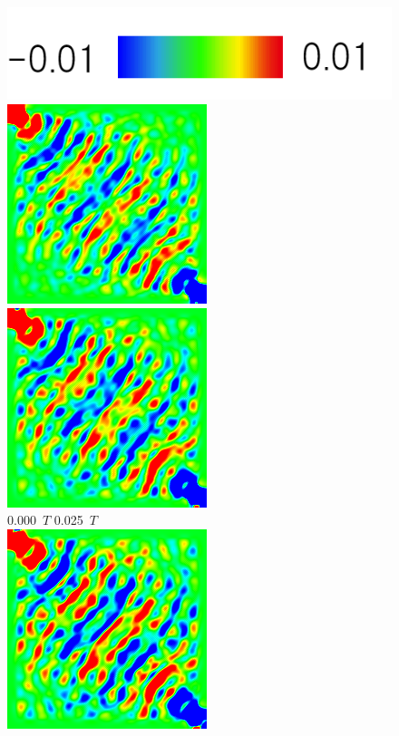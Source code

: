 \documentclass[a4j, twocolumn]{jsarticle}
\begin{document}
\begin{figure}
\centering
\includegraphics[width=0.4\hsize]{./figures/colorbar_001.png} \\
\includegraphics[width=0.4\hsize]{./figures/capture/sqr/sinsqr128_32i_l_dif_7060} \ 
\includegraphics[width=0.4\hsize]{./figures/capture/sqr/sinsqr128_32i_l_dif_7061} \\
0.000\ $T$ \hspace*{0.25\hsize} 0.025\ $T$  \vspace{5pt}\\
\includegraphics[width=0.4\hsize]{./figures/capture/sqr/sinsqr128_32i_l_dif_7062} \ 

\end{figure}
\end{document}
